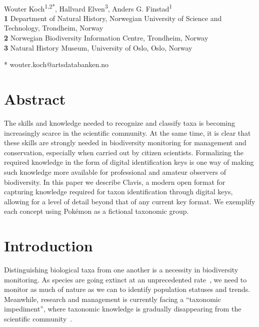 \documentclass[10pt,letterpaper]{article}
\begin{document}
\vspace*{0.2in}

\begin{flushleft}
{\Large
\textbf{}
}
\newline
\\
Wouter Koch\textsuperscript{1,2*},
Hallvard Elven\textsuperscript{3},
Anders G. Finstad\textsuperscript{1}
\\
\bigskip
\textbf{1} Department of Natural History, Norwegian University of Science and Technology, Trondheim, Norway
\\
\textbf{2} Norwegian Biodiversity Information Centre, Trondheim, Norway
\\
\textbf{3} Natural History Museum, University of Oslo, Oslo, Norway
\\
\bigskip

* wouter.koch@artsdatabanken.no

\end{flushleft}
\newpage
\section*{
Abstract
}
The skills and knowledge needed to recognize and classify taxa is becoming increasingly scarce in the scientific community. At the same time, it is clear that these skills are strongly needed in biodiversity monitoring for management and conservation, especially when carried out by citizen scientists. Formalizing the required knowledge in the form of digital identification keys is one way of making such knowledge more available for professional and amateur observers of biodiversity. In this paper we describe Clavis, a modern open format for capturing knowledge required for taxon identification through digital keys, allowing for a level of detail beyond that of any current key format. We exemplify each concept using Pokémon as a fictional taxonomic group.

\section*{
Introduction
}
Distinguishing biological taxa from one another is a necessity in biodiversity monitoring. As species are going extinct at an unprecedented rate~\cite{Ceballos2015, Johnson2017}, we need to monitor as much of nature as we can to identify population statuses and trends. Meanwhile, research and management is currently facing a ``taxonomic impediment'', where taxonomic knowledge is gradually disappearing from the scientific community~\cite{Engel2021}.
\end{document}

